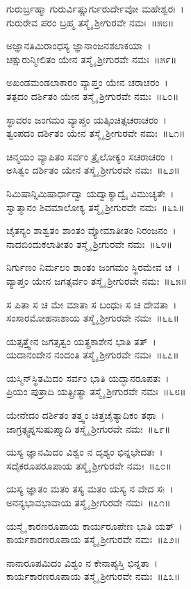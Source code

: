 ಗುರುರ್ಬ್ರಹ್ಮಾ ಗುರುರ್ವಿಷ್ಣುರ್ಗುರುರ್ದೇವೋ ಮಹೇಶ್ವರಃ~।\\
ಗುರುರೇವ ಪರಂ ಬ್ರಹ್ಮ ತಸ್ಮೈ ಶ್ರೀಗುರವೇ ನಮಃ~॥೫೮॥

ಅಜ್ಞಾನತಿಮಿರಾಂಧಸ್ಯ ಜ್ಞಾನಾಂಜನಶಲಾಕಯಾ~।\\
ಚಕ್ಷುರುನ್ಮೀಲಿತಂ ಯೇನ ತಸ್ಮೈ ಶ್ರೀಗುರವೇ ನಮಃ~॥೫೯॥

ಅಖಂಡಮಂಡಲಾಕಾರಂ ವ್ಯಾಪ್ತಂ ಯೇನ ಚರಾಚರಂ~।\\
ತತ್ಪದಂ ದರ್ಶಿತಂ ಯೇನ ತಸ್ಮೈ ಶ್ರೀಗುರವೇ ನಮಃ~॥೬೦॥

ಸ್ಥಾವರಂ ಜಂಗಮಂ ವ್ಯಾಪ್ತಂ ಯತ್ಕಿಂಚಿತ್ಸಚರಾಚರಂ~।\\
ತ್ವಂಪದಂ ದರ್ಶಿತಂ ಯೇನ ತಸ್ಮೈ ಶ್ರೀಗುರವೇ ನಮಃ~॥೬೧॥

ಚಿನ್ಮಯಂ ವ್ಯಾಪಿತಂ ಸರ್ವಂ ತ್ರೈಲೋಕ್ಯಂ ಸಚರಾಚರಂ~।\\
ಅಸಿತ್ವಂ ದರ್ಶಿತಂ ಯೇನ ತಸ್ಮೈ ಶ್ರೀಗುರವೇ ನಮಃ~॥೬೨॥

ನಿಮಿಷಾನ್ನಿಮಿಷಾರ್ಧಾದ್ವಾ ಯದ್ವಾಕ್ಯಾದ್ವೈ ವಿಮುಚ್ಯತೇ~।\\
ಸ್ವಾತ್ಮಾನಂ ಶಿವಮಾಲೋಕ್ಯ ತಸ್ಮೈ ಶ್ರೀಗುರವೇ ನಮಃ~॥೬೩॥

ಚೈತನ್ಯಂ ಶಾಶ್ವತಂ ಶಾಂತಂ ವ್ಯೋಮಾತೀತಂ ನಿರಂಜನಂ~।\\
ನಾದಬಿಂದುಕಲಾತೀತಂ ತಸ್ಮೈ ಶ್ರೀಗುರವೇ ನಮಃ~॥೬೪॥

ನಿರ್ಗುಣಂ ನಿರ್ಮಲಂ ಶಾಂತಂ ಜಂಗಮಂ ಸ್ಥಿರಮೇವ ಚ~।\\
ವ್ಯಾಪ್ತಂ ಯೇನ ಜಗತ್ಸರ್ವಂ ತಸ್ಮೈ ಶ್ರೀಗುರವೇ ನಮಃ~॥೬೫॥

ಸ ಪಿತಾ ಸ ಚ ಮೇ ಮಾತಾ ಸ ಬಂಧುಃ ಸ ಚ ದೇವತಾ~।\\
ಸಂಸಾರಮೋಹನಾಶಾಯ ತಸ್ಮೈ ಶ್ರೀಗುರವೇ ನಮಃ~॥೬೬॥

ಯತ್ಸತ್ತ್ವೇನ ಜಗತ್ಸತ್ವಂ ಯತ್ಪ್ರಕಾಶೇನ ಭಾತಿ ತತ್~।\\
ಯದಾನಂದೇನ ನಂದಂತಿ ತಸ್ಮೈ ಶ್ರೀಗುರವೇ ನಮಃ~॥೬೭॥

ಯಸ್ಮಿನ್‌ಸ್ಥಿತಮಿದಂ ಸರ್ವಂ ಭಾತಿ ಯದ್ಭಾನರೂಪತಃ~।\\
ಪ್ರಿಯಂ ಪುತ್ರಾದಿ ಯತ್ಪ್ರೀತ್ಯಾ ತಸ್ಮೈ ಶ್ರೀಗುರವೇ ನಮಃ~॥೬೮॥

ಯೇನೇದಂ ದರ್ಶಿತಂ ತತ್ತ್ವಂ ಚಿತ್ತಚೈತ್ಯಾದಿಕಂ ತಥಾ~।\\
ಜಾಗ್ರತ್ಸ್ವಪ್ನಸುಷುಪ್ತ್ಯಾದಿ ತಸ್ಮೈ ಶ್ರೀಗುರವೇ ನಮಃ~॥೬೯॥

ಯಸ್ಯ ಜ್ಞಾನಮಿದಂ ವಿಶ್ವಂ ನ ದೃಶ್ಯಂ ಭಿನ್ನಭೇದತಃ~।\\
ಸದೈಕರೂಪರೂಪಾಯ ತಸ್ಮೈ ಶ್ರೀಗುರವೇ ನಮಃ~॥೭೦॥

ಯಸ್ಯ ಜ್ಞಾತಂ ಮತಂ ತಸ್ಯ ಮತಂ ಯಸ್ಯ ನ ವೇದ ಸಃ~।\\
ಅನನ್ಯಭಾವಭಾವಾಯ ತಸ್ಮೈ ಶ್ರೀಗುರವೇ ನಮಃ~॥೭೧॥

ಯಸ್ಮೈ ಕಾರಣರೂಪಾಯ ಕಾರ್ಯರೂಪೇಣ ಭಾತಿ ಯತ್~।\\
ಕಾರ್ಯಕಾರಣರೂಪಾಯ ತಸ್ಮೈ ಶ್ರೀಗುರವೇ ನಮಃ~॥೭೨॥

ನಾನಾರೂಪಮಿದಂ ವಿಶ್ವಂ ನ ಕೇನಾಪ್ಯಸ್ತಿ ಭಿನ್ನತಾ~।\\
ಕಾರ್ಯಕಾರಣರೂಪಾಯ ತಸ್ಮೈ ಶ್ರೀಗುರವೇ ನಮಃ~॥೭೩॥

